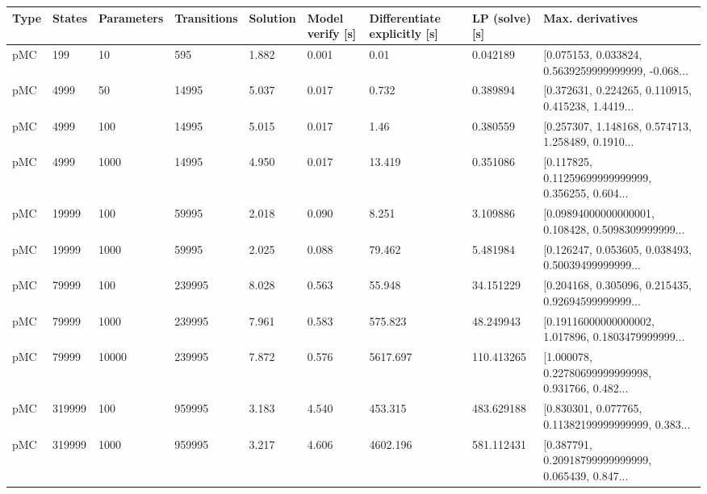 \begin{tabular}{lllllllll}
\toprule
Type & States & Parameters & Transitions &  Solution & Model verify [s] & Differentiate explicitly [s] & LP (solve) [s] &                                   Max. derivatives \\
\midrule
 pMC &    199 &         10 &         595 &     1.882 &            0.001 &                         0.01 &       0.042189 & [0.075153, 0.033824, 0.5639259999999999, -0.068... \\
 pMC &   4999 &         50 &       14995 &     5.037 &            0.017 &                        0.732 &       0.389894 & [0.372631, 0.224265, 0.110915, 0.415238, 1.4419... \\
 pMC &   4999 &        100 &       14995 &     5.015 &            0.017 &                         1.46 &       0.380559 & [0.257307, 1.148168, 0.574713, 1.258489, 0.1910... \\
 pMC &   4999 &       1000 &       14995 &     4.950 &            0.017 &                       13.419 &       0.351086 & [0.117825, 0.11259699999999999, 0.356255, 0.604... \\
 pMC &  19999 &        100 &       59995 &     2.018 &            0.090 &                        8.251 &       3.109886 & [0.09894000000000001, 0.108428, 0.5098309999999... \\
 pMC &  19999 &       1000 &       59995 &     2.025 &            0.088 &                       79.462 &       5.481984 & [0.126247, 0.053605, 0.038493, 0.50039499999999... \\
 pMC &  79999 &        100 &      239995 &     8.028 &            0.563 &                       55.948 &      34.151229 & [0.204168, 0.305096, 0.215435, 0.92694599999999... \\
 pMC &  79999 &       1000 &      239995 &     7.961 &            0.583 &                      575.823 &      48.249943 & [0.19116000000000002, 1.017896, 0.1803479999999... \\
 pMC &  79999 &      10000 &      239995 &     7.872 &            0.576 &                     5617.697 &     110.413265 & [1.000078, 0.22780699999999998, 0.931766, 0.482... \\
 pMC & 319999 &        100 &      959995 &     3.183 &            4.540 &                      453.315 &     483.629188 & [0.830301, 0.077765, 0.11382199999999999, 0.383... \\
 pMC & 319999 &       1000 &      959995 &     3.217 &            4.606 &                     4602.196 &     581.112431 & [0.387791, 0.20918799999999999, 0.065439, 0.847... \\

\end{tabular}
